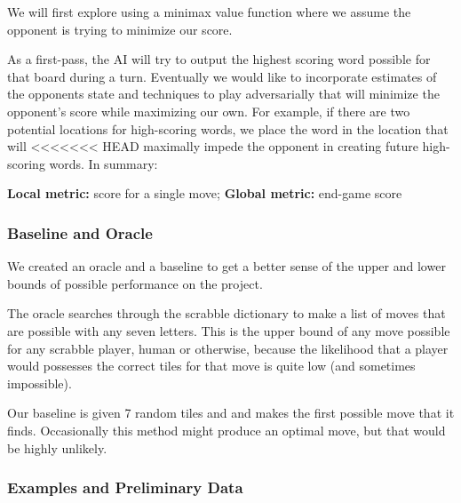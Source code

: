 \documentclass[12pt]{article}
\begin{document}
We will first explore using a minimax value function where we assume
the opponent is trying to minimize our score.

As a first-pass, the AI will try to output the highest scoring word
possible for that board during a turn.  Eventually we would like to
incorporate estimates of the opponents state and techniques to play
adversarially that will minimize the opponent's score while maximizing
our own. For example, if there are two potential locations for
high-scoring words, we place the word in the location that will
<<<<<<< HEAD
maximally impede the opponent in creating future high-scoring
words. In summary:

\textbf{Local metric:} score for a single move; \textbf{Global metric:} end-game score

\subsubsection*{Baseline and Oracle}

We created an oracle and a baseline to get a better sense of the upper
and lower bounds of possible performance on the project.

The oracle searches through the scrabble dictionary to make a list of
moves that are possible with any seven letters. This is the upper bound of
any move possible for any scrabble player, human or otherwise, because
the likelihood that a player would possesses the correct tiles for that
move is quite low (and sometimes impossible).

Our baseline is given 7 random tiles and and makes the
first possible move that it finds. Occasionally this method might
produce an optimal move, but that would be highly unlikely.

\subsubsection*{Examples and Preliminary Data}
\end{document}
